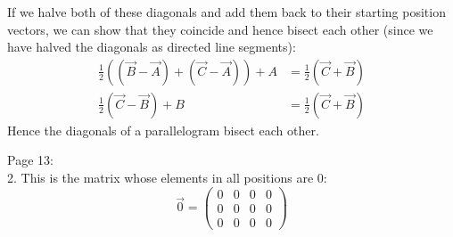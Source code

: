 \documentclass[11pt]{article}
\newcommand{\br}[1]{\left(#1\right)}
\begin{document}
If we halve both of these diagonals and add them back to their starting position vectors, we can show that they coincide and hence bisect each other (since we have halved the diagonals as directed line segments):
\begin{align*}
    \frac{1}{2}\br{\br{\vec{B} - \vec{A}} + \br{\vec{C} - \vec{A}}} + A &= \frac{1}{2}\br{\vec{C}+\vec{B}} \\ \frac{1}{2}\br{\vec{C}-\vec{B}} + B &= \frac{1}{2}\br{\vec{C}+\vec{B}}
\end{align*}
Hence the diagonals of a parallelogram bisect each other.

Page 13: \\

2. This is the matrix whose elements in all positions are $0$: $$\boxed{\vec{0} = \begin{pmatrix}
    0&0&0&0 \\
    0&0&0&0 \\
    0&0&0&0
\end{pmatrix}}$$
\end{document}
